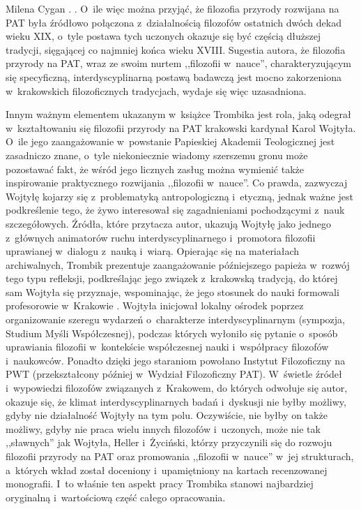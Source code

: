 \begin{newrevplenv}{Milena Cygan}
{%
\parencite[][s.~254]{wiszniewski_uwagi_1839}.%
}.
O~ile więc można przyjąć, że filozofia przyrody rozwijana na PAT była źródłowo połączona z~działalnością filozofów ostatnich dwóch dekad wieku XIX, o~tyle postawa tych uczonych okazuje się być częścią dłuższej tradycji, sięgającej co najmniej końca wieku XVIII. Sugestia autora, że filozofia przyrody na PAT, wraz ze swoim nurtem ,,filozofii w~nauce'', charakteryzującym się specyficzną, interdyscyplinarną postawą badawczą jest mocno zakorzeniona w~krakowskich filozoficznych tradycjach, wydaje się więc uzasadniona.

Innym ważnym elementem ukazanym w~książce Trombika jest rola, jaką odegrał w~kształtowaniu się filozofii przyrody na PAT krakowski kardynał Karol Wojtyła. O~ile jego zaangażowanie w~powstanie Papieskiej Akademii Teologicznej jest zasadniczo znane, o~tyle niekoniecznie wiadomy szerszemu gronu może pozostawać fakt, że wśród jego licznych zasług można wymienić także inspirowanie praktycznego rozwijania ,,filozofii w~nauce''. Co prawda, zazwyczaj Wojtyłę kojarzy się z~problematyką antropologiczną i~etyczną, jednak ważne jest podkreślenie tego, że żywo interesował się zagadnieniami pochodzącymi z~nauk szczegółowych. Źródła, które przytacza autor, ukazują Wojtyłę jako jednego z~głównych animatorów ruchu interdyscyplinarnego i~promotora filozofii uprawianej w~dialogu z~nauką i~wiarą. Opierając się na materiałach archiwalnych, Trombik prezentuje zaangażowanie późniejszego papieża w~rozwój tego typu refleksji, podkreślając jego związek z~krakowską tradycją, do której sam Wojtyła się przyznaje, wspominając, że jego stosunek do nauki formowali profesorowie w~Krakowie 
\parencite[][s.~71]{trombik_koncepcje_2021}. %
 Wojtyła inicjował lokalny ośrodek poprzez organizowanie szeregu wydarzeń o~charakterze interdyscyplinarnym (sympozja, Studium Myśli Współczesnej), podczas których wyłoniło się pytanie o~sposób uprawiania filozofii w~kontekście współczesnej nauki i~współpracy filozofów i~naukowców. Ponadto dzięki jego staraniom powołano Instytut Filozoficzny na PWT (przekształcony później w~Wydział Filozoficzny PAT). W~świetle źródeł i~wypowiedzi filozofów związanych z~Krakowem, do których odwołuje się autor, okazuje się, że klimat interdyscyplinarnych badań i~dyskusji nie byłby możliwy, gdyby nie działalność Wojtyły na tym polu. Oczywiście, nie byłby on także możliwy, gdyby nie praca wielu innych filozofów i~uczonych, może nie tak ,,sławnych'' jak Wojtyła, Heller i~Życiński, którzy przyczynili się do rozwoju filozofii przyrody na PAT oraz promowania ,,filozofii w~nauce'' w~jej strukturach, a~których wkład został doceniony i~upamiętniony na kartach recenzowanej monografii. I~to właśnie ten aspekt pracy Trombika stanowi najbardziej oryginalną i~wartościową część całego opracowania.


\end{newrevplenv}
